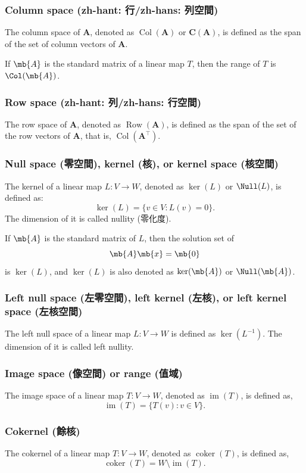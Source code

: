 \documentclass[a4paper,12pt]{report}
\begin{document}
\subsubsection{Column space (zh-hant: 行/zh-hans: 列空間)}
The column space of $\mathbf{A}$, denoted as \(\operatorname{Col}(\mathbf{A})\) or $\mathrm{\mathbf{C}}(\mathbf{A})$, is defined as the span of the set of column vectors of $\mathbf{A}$.

If $\mb{A}$ is the standard matrix of a linear map $T$, then the range of $T$ is $\Col(\mb{A})$.
\subsubsection{Row space (zh-hant: 列/zh-hans: 行空間)}
The row space of $\mathbf{A}$, denoted as \(\operatorname{Row}(\mathbf{A})\), is defined as the span of the set of the row vectors of $\mathbf{A}$, that is, $\operatorname{Col}(\mathbf{A}^{\top})$.
\subsubsection{Null space (零空間), kernel (核), or kernel space (核空間)}
The kernel of a linear map $L\colon V\to W$, denoted as $\ker(L)$ or $\Null(L)$, is defined as:
\[\ker(L)=\{v\in V\colon L(v)=0\}.\]
The dimension of it is called nullity (零化度).

If $\mb{A}$ is the standard matrix of $L$, then the solution set of
\[\mb{A}\mb{x}=\mb{0}\]
is $\ker(L)$, and $\ker(L)$ is also denoted as $\ker(\mb{A})$ or $\Null(\mb{A})$.
\subsubsection{Left null space (左零空間), left kernel (左核), or left kernel space (左核空間)}
The left null space of a linear map $L\colon V\to W$ is defined as $\ker(L^{-1})$. The dimension of it is called left nullity.
\subsubsection{Image space (像空間) or range (值域)}
The image space of a linear map $T\colon V\to W$, denoted as $\operatorname{im}(T)$, is defined as,
\[\operatorname{im}(T)=\{T(v)\colon v\in V\}.\]
\subsubsection{Cokernel (餘核)}
The cokernel of a linear map $T\colon V\to W$, denoted as $\operatorname{coker}(T)$, is defined as,
\[\operatorname{coker}(T)=W\setminus\operatorname{im}(T).\]
\end{document}
